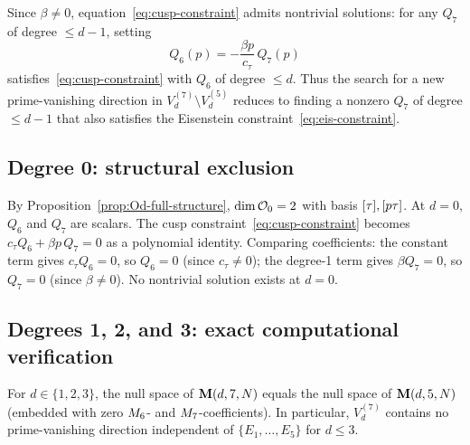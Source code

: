 \documentclass[11pt]{article}
\begin{document}
Since $\beta\ne 0$, equation~\eqref{eq:cusp-constraint} admits nontrivial solutions:
for any $Q_7$ of degree $\le d-1$, setting
\begin{equation}
  \label{eq:Q6-from-Q7}
  Q_6(p) = -\frac{\beta p}{c_\tau}\,Q_7(p)
\end{equation}
satisfies~\eqref{eq:cusp-constraint} with $Q_6$ of degree $\le d$.
Thus the search for a new prime-vanishing direction in $V_d^{(7)}\setminus V_d^{(5)}$
reduces to finding a nonzero $Q_7$ of degree $\le d-1$ that also satisfies the
Eisenstein constraint~\eqref{eq:eis-constraint}.

\subsection{Degree 0: structural exclusion}

By Proposition~\ref{prop:Od-full-structure}, $\dim\mathcal{O}_0=2$ with basis $[\tau],[p\tau]$.
At $d=0$, $Q_6$ and $Q_7$ are scalars.
The cusp constraint~\eqref{eq:cusp-constraint} becomes $c_\tau Q_6 + \beta p\,Q_7 = 0$
as a polynomial identity.
Comparing coefficients: the constant term gives $c_\tau Q_6=0$, so $Q_6=0$ (since
$c_\tau\ne 0$); the degree-1 term gives $\beta Q_7=0$, so $Q_7=0$ (since $\beta\ne 0$).
No nontrivial solution exists at $d=0$.

\subsection{Degrees 1, 2, and 3: exact computational verification}

\begin{proposition}
\label{prop:no-recovery-d23}
For $d\in\{1,2,3\}$, the null space of $\mathbf{M}(d,7,N)$ equals the null space of
$\mathbf{M}(d,5,N)$ (embedded with zero $M_{6}$- and $M_{7}$-coefficients).
In particular, $V_d^{(7)}$ contains no prime-vanishing direction independent of
$\{E_1,\dots,E_5\}$ for $d\le 3$.
\end{proposition}
\end{document}
